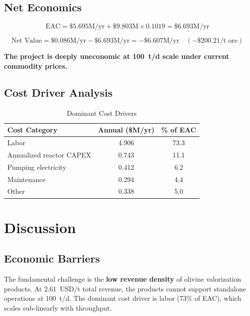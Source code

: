 \documentclass[11pt,a4paper]{article}
\begin{document}
\subsection{Net Economics}

\begin{equation}
  \text{EAC} = \$5.695\text{M/yr} + \$9.803\text{M} \times 0.1019 = \$6.693\text{M/yr}
\end{equation}

\begin{equation}
  \text{Net Value} = \$0.086\text{M/yr} - \$6.693\text{M/yr} = -\$6.607\text{M/yr} \quad (-\$200.21/\text{t ore})
\end{equation}

\textbf{The project is deeply uneconomic at \SI{100}{t/d} scale under current commodity prices.}

\subsection{Cost Driver Analysis}

\begin{table}[H]
\centering
\caption{Dominant Cost Drivers}
\label{tab:drivers}
\begin{tabular}{lcc}
\toprule
\textbf{Cost Category} & \textbf{Annual (\$M/yr)} & \textbf{\% of EAC} \\
\midrule
Labor                    & 4.906 & 73.3 \\
Annualized reactor CAPEX & 0.743 & 11.1 \\
Pumping electricity      & 0.412 & 6.2 \\
Maintenance              & 0.294 & 4.4 \\
Other                    & 0.338 & 5.0 \\
\bottomrule
\end{tabular}
\end{table}

\section{Discussion}

\subsection{Economic Barriers}

The fundamental challenge is the \textbf{low revenue density} of olivine valorization products.
At \SI{2.61}{USD/t} total revenue, the products cannot support standalone operations at \SI{100}{t/d}.
The dominant cost driver is labor (73\% of EAC), which scales sub-linearly with throughput.
\end{document}
